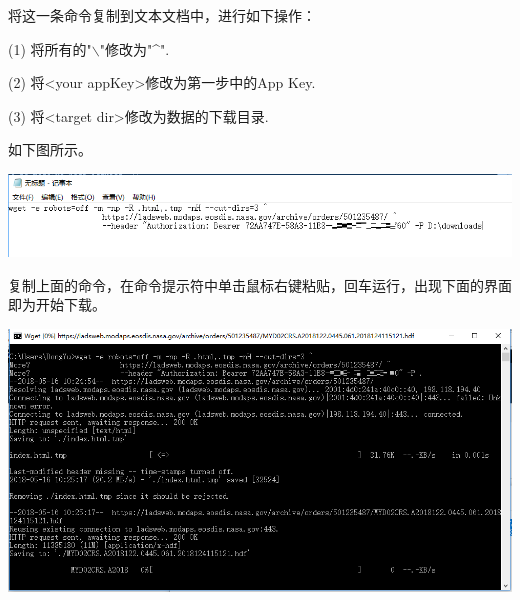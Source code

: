 \documentclass{article}
\begin{document}
	将这一条命令复制到文本文档中，进行如下操作：
	
	(1) 将所有的"$\backslash$"修改为"\^{}".
	
	(2) 将<your appKey>修改为第一步中的App Key.
	
	(3) 将<target dir>修改为数据的下载目录.
	
	如下图所示。
	
	\includegraphics[width=\linewidth]{sec4_2.png}
	
	
	复制上面的命令，在命令提示符中单击鼠标右键粘贴，回车运行，出现下面的界面即为开始下载。
	
	\includegraphics[width=\linewidth]{sec4_3.png}
	
\end{document}
